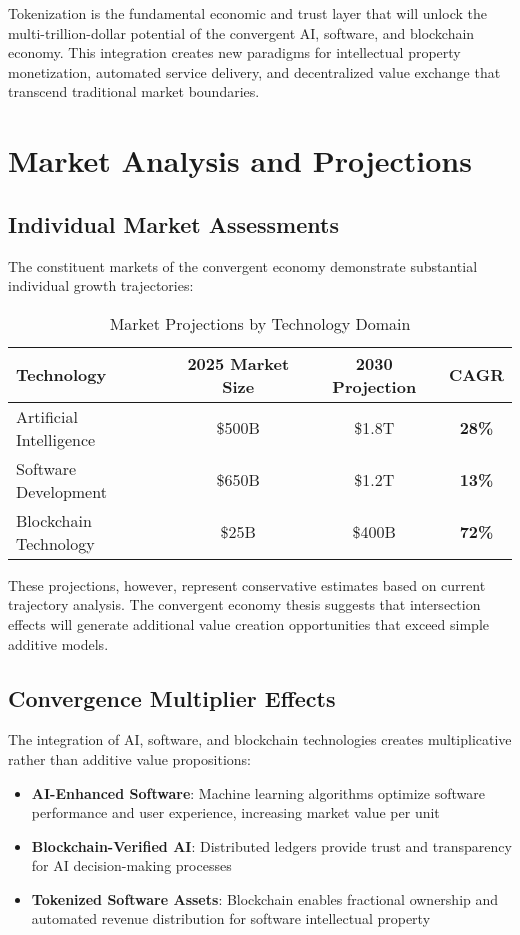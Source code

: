 \documentclass[11pt]{article}
\newcommand{\cagr}[1]{\textcolor{primaryblue}{\textbf{#1\%}}}
\begin{document}
Tokenization is the fundamental economic and trust layer that will unlock the multi-trillion-dollar potential of the convergent AI, software, and blockchain economy. This integration creates new paradigms for intellectual property monetization, automated service delivery, and decentralized value exchange that transcend traditional market boundaries.

\section{Market Analysis and Projections}

\subsection{Individual Market Assessments}

The constituent markets of the convergent economy demonstrate substantial individual growth trajectories:

\begin{table}[h]
\centering
\caption{Market Projections by Technology Domain}
\begin{tabular}{@{}lccc@{}}
\toprule
Technology & 2025 Market Size & 2030 Projection & CAGR \\
\midrule
Artificial Intelligence & \$500B & \$1.8T & \cagr{28} \\
Software Development & \$650B & \$1.2T & \cagr{13} \\
Blockchain Technology & \$25B & \$400B & \cagr{72} \\
\bottomrule
\end{tabular}
\end{table}

These projections, however, represent conservative estimates based on current trajectory analysis. The convergent economy thesis suggests that intersection effects will generate additional value creation opportunities that exceed simple additive models.

\subsection{Convergence Multiplier Effects}

The integration of AI, software, and blockchain technologies creates multiplicative rather than additive value propositions:

\begin{itemize}
\item \textbf{AI-Enhanced Software}: Machine learning algorithms optimize software performance and user experience, increasing market value per unit
\item \textbf{Blockchain-Verified AI}: Distributed ledgers provide trust and transparency for AI decision-making processes
\item \textbf{Tokenized Software Assets}: Blockchain enables fractional ownership and automated revenue distribution for software intellectual property
\end{itemize}
\end{document}
